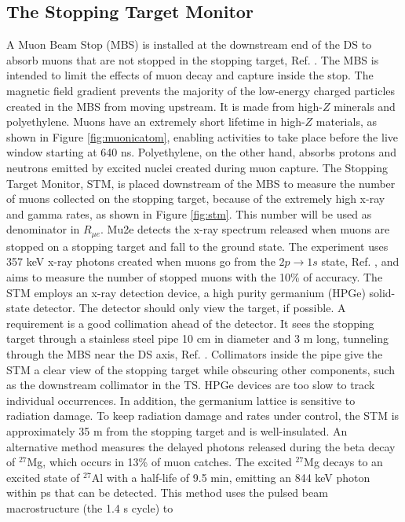 \subsection{The Stopping Target Monitor}
A Muon Beam Stop (MBS) is installed at the downstream end of the DS to absorb muons that are 
not stopped in the stopping target, Ref. \cite{bartoszek2015mu2e}. The MBS is intended to limit 
the effects of muon decay and capture inside the stop. The magnetic field gradient prevents 
the majority of the low-energy charged particles created in the MBS from moving upstream. 
It is made from high-$Z$ minerals and polyethylene. Muons have an extremely short lifetime 
in high-$Z$ materials, as shown in Figure \ref{fig:muonicatom}, enabling activities to take 
place before the live window starting at 640 ns. Polyethylene, on the other hand, absorbs 
protons and neutrons emitted by excited nuclei created during muon capture.
The Stopping Target Monitor, STM, is placed downstream of the MBS to measure the number of 
muons collected on the stopping target, because of the extremely high x-ray and gamma rates, 
as shown in Figure \ref{fig:stm}. This number will be used as denominator in $R_{\mu e}$.
 Mu2e detects the x-ray spectrum released when muons are stopped on a stopping target and fall 
 to the ground state. The experiment uses 357 keV x-ray photons created when muons go from the 
 $2p \rightarrow 1s$ state, Ref. \cite{bobbb}, and aims to measure the number of stopped muons 
 with the 10\% of accuracy. The STM employs an x-ray detection device, a high purity germanium 
 (HPGe) solid-state detector. The detector should only view the target, if possible. A requirement 
 is a good collimation ahead of the detector. It sees the stopping target through a stainless steel 
 pipe 10 cm in diameter and 3 m long, tunneling through the MBS near the DS axis, Ref. \cite{stm}. 
 Collimators inside the pipe give the STM a clear view of the stopping target while obscuring other 
 components, such as the downstream collimator in the TS. HPGe devices are too slow to track individual 
 occurrences. In addition, the germanium lattice is sensitive to radiation damage. To keep radiation 
 damage and rates under control, the STM is approximately 35 m from the stopping target and is 
 well-insulated. An alternative method measures the delayed photons released during the beta 
 decay of $^{27}$Mg, which occurs in 13\% of muon catches. The excited $^{27}$Mg decays to an 
 excited state of $^{27}$Al with a half-life of 9.5 min, emitting an 844 keV photon within ps 
 that can be detected. This method uses the pulsed beam macrostructure (the 1.4 s cycle) to 
